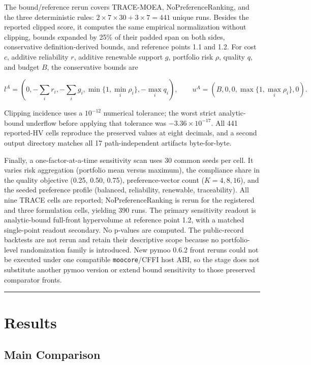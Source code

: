 \documentclass[energies,article,submit,moreauthors]{Definitions/mdpi}
\begin{document}
The bound/reference rerun covers TRACE-MOEA, NoPreferenceRanking, and the three deterministic rules: \(2\times7\times30+3\times7=441\) unique runs. Besides the reported clipped score, it computes the same empirical normalization without clipping, bounds expanded by 25\% of their padded span on both sides, conservative definition-derived bounds, and reference points 1.1 and 1.2. For cost \(c\), additive reliability \(r\), additive renewable support \(g\), portfolio risk \(\rho\), quality \(q\), and budget \(B\), the conservative bounds are

\[
l^A=(0,-\textstyle\sum_i r_i,-\textstyle\sum_i g_i,\min\{1,\min_i\rho_i\},-\max_i q_i),\qquad
u^A=(B,0,0,\max\{1,\max_i\rho_i\},0).
\]

Clipping incidence uses a \(10^{-12}\) numerical tolerance; the worst strict analytic-bound underflow before applying that tolerance was \(-3.36\times10^{-17}\). All 441 reported-HV cells reproduce the preserved values at eight decimals, and a second output directory matches all 17 path-independent artifacts byte-for-byte.

Finally, a one-factor-at-a-time sensitivity scan uses 30 common seeds per cell. It varies risk aggregation (portfolio mean versus maximum), the compliance share in the quality objective (0.25, 0.50, 0.75), preference-vector count (\(K=4,8,16\)), and the seeded preference profile (balanced, reliability, renewable, traceability). All nine TRACE cells are reported; NoPreferenceRanking is rerun for the registered and three formulation cells, yielding 390 runs. The primary sensitivity readout is analytic-bound full-front hypervolume at reference point 1.2, with a matched single-point readout secondary. No p-values are computed. The public-record backtests are not rerun and retain their descriptive scope because no portfolio-level randomization family is introduced. New pymoo 0.6.2 front reruns could not be executed under one compatible \texttt{moocore}/CFFI host ABI, so the stage does not substitute another pymoo version or extend bound sensitivity to those preserved comparator fronts.

\begin{center}\rule{0.5\linewidth}{0.5pt}\end{center}

\section{Results}\label{results}

\subsection{Main Comparison}\label{main-comparison}
\end{document}
